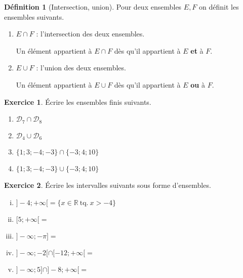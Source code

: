 \documentclass[a4paper, 14pt]{extarticle}
\theoremstyle{plain}
\theoremstyle{definition}
\newtheorem{ex}{Exercice}
\newtheorem*{definition}{Définition}
\newcommand{\R}{\mathbb{R}}
\begin{document}
\pagestyle{fancy}
\fancyhead[R]{\today}

\begin{center}
\end{center}

\begin{definition}[Intersection, union]
	Pour deux ensembles $E, F$ on définit les ensembles suivants.
		\begin{enumerate}
			\item $E \cap F$ : l'intersection des deux ensembles.
			
			Un élément appartient à $E \cap F$ dès qu'il appartient à $E$ \textbf{et} à $F$.
			\item $E \cup F$ : l'union des deux ensembles.
			
			Un élément appartient à $E \cup F$ dès qu'il appartient à $E$ \textbf{ou} à $F$.
		\end{enumerate}
\end{definition}

\begin{ex}
	Écrire les ensembles finis suivants.
	\begin{multicols}{2}
	\begin{enumerate}
		\item $\mathcal{D}_7 \cap \mathcal{D}_8$
		\item $\mathcal{D}_4 \cup \mathcal{D}_6$
		\item $\{1; 3; -4; -3\} \cap \{ -3 ; 4 ; 10\}$
		\item $\{1 ; 3 ; -4 ; -3 \} \cup \{ -3 ; 4 ; 10\}$
	\end{enumerate}
	\end{multicols}
\end{ex}

\begin{ex}
	Écrire les intervalles suivants sous forme d'ensembles.
	\begin{enumerate}[i)]\itemsep10pt
		\item $]{-}4 ; {+}\infty [ = \{ x \in \R \ \text{tq.} \ x > -4 \}$
		\item $[5 ; {+}\infty [ = $
		\item $]{-}\infty ; -\pi ] = $
		\item $]{-}\infty ; -2[ \cap [-12 ; {+}\infty[ = $
		\item $]{-} \infty ; 5] \cap ]-8 ; {+}\infty [ = $
	\end{enumerate}
\end{ex}
\end{document}
